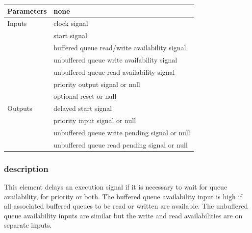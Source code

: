                 \begin{tabular}{| l | l |}
                \hline
                Parameters  & none \\
                \hline
                Inputs      & clock signal \\
                            & start signal \\
                            & buffered queue read/write availability signal \\
                            & unbuffered queue write availability signal \\
                            & unbuffered queue read availability signal \\
                            & priority output signal or null \\
                            & optional reset or null \\
                \hline
                Outputs     & delayed start signal \\
                            & priority input signal or null \\
                            & unbuffered queue write pending signal or null \\
                            & unbuffered queue read pending signal or null \\
                \hline
                \end{tabular}

            \subsubsection{description}
            
                This element delays an execution signal if it is necessary to
                wait for queue availability, for priority or both. The buffered
                queue availability input is high if all associated buffered
                queues to be read or written are available. The unbuffered queue
                availability inputs are similar but the write and read
                availabilities are on separate inputs.
                
